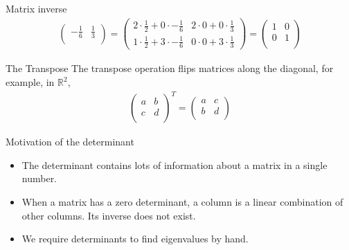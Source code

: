 \documentclass[notes=only]{beamer}
\begin{document}
\begin{frame}{Matrix inverse}
{\begin{align}
\begin{pmatrix}
          -\frac{1}{6} & \frac{1}{3}\\ 
        \end{pmatrix}
      = 
        \begin{pmatrix}
          2 \cdot \frac{1}{2} + 0 \cdot -\frac{1}{6} & 2 \cdot 0 + 0 \cdot \frac{1}{3}  \\
          1 \cdot \frac{1}{2} + 3 \cdot -\frac{1}{6} & 0 \cdot 0 + 3 \cdot \frac{1}{3} 
        \end{pmatrix}
      =
      \begin{pmatrix}
        1 & 0 \\
        0 & 1 \\ 
      \end{pmatrix}
      \end{align}
      }
    \end{frame}


    \begin{frame}{The Transpose}
      The transpose operation flips matrices along the diagonal, for example, in $\mathbb{R}^2$,
      \begin{align}
        \begin{pmatrix}
          a & b \\
          c & d \\
        \end{pmatrix}^T
        =
        \begin{pmatrix}
          a & c \\
          b & d \\
        \end{pmatrix}
      \end{align}
    \end{frame}

    \begin{frame}{Motivation of the determinant}
      \begin{itemize}
        \item The determinant contains lots of information about a matrix in a single number.
        \item When a matrix has a zero determinant, a column is a linear combination of other
          columns. Its inverse does not exist.
        \item We require determinants to find eigenvalues by hand.
      \end{itemize}
    \end{frame}
\end{document}
